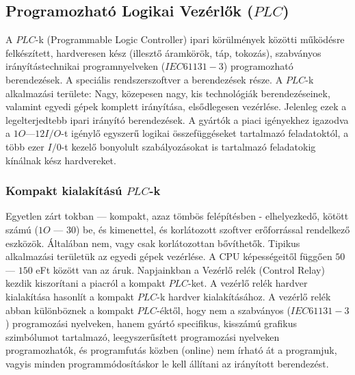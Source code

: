 \documentclass[11pt,a4paper]{article}
\begin{document}
\subsection{Programozható Logikai Vezérlők ($PLC$)}
A $PLC$-k (Programmable Logic Controller) ipari körülmények közötti működésre felkészített, hardveresen kész (illesztő áramkörök, táp, tokozás), szabványos irányítástechnikai programnyelveken ($IEC61131-3$) programozható berendezések. A speciális rendszerszoftver a berendezések része.
A $PLC$-k alkalmazási területe: Nagy, közepesen nagy, kis technológiák berendezéseinek, valamint egyedi gépek komplett irányítása, elsődlegesen vezérlése. Jelenleg ezek a legelterjedtebb ipari irányító berendezések. A gyártók a piaci igényekhez igazodva a $1O — 12 I/O$-t igénylő egyszerű logikai összefüggéseket tartalmazó feladatoktól, a több ezer $I/0$-t kezelő bonyolult szabályozásokat is tartalmazó feladatokig kínálnak kész hardvereket.
\subsubsection{Kompakt kialakítású $PLC$-k}
Egyetlen zárt tokban — kompakt, azaz tömbös felépítésben - elhelyezkedő, kötött számú ($1O$ — $30$) be, és kimenettel, és korlátozott szoftver erőforrással rendelkező eszközök. Általában nem, vagy csak korlátozottan bővíthetők. Tipikus alkalmazási területük az egyedi gépek vezérlése. A CPU képességeitől függően $50$ — $150$ eFt között van az áruk.
Napjainkban a Vezérlő relék (Control Relay) kezdik kiszorítani a piacról a kompakt $PLC$-ket. A vezérlő relék hardver kialakítása hasonlít a kompakt $PLC$-k hardver kialakításához. A vezérlő relék abban különböznek a kompakt $PLC$-éktől, hogy nem a szabványos ($IEC61131-3$) programozási nyelveken, hanem gyártó specifikus, kisszámú grafikus szimbólumot tartalmazó, leegyszerűsített programozási nyelveken programozhatók, és programfutás közben (online) nem írható át a programjuk, vagyis minden programmódosításkor le kell állítani az irányított berendezést.
\end{document}
